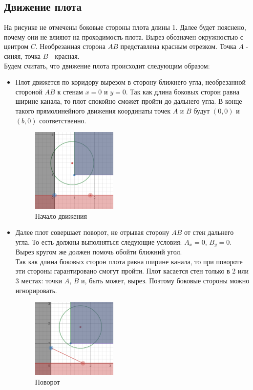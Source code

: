\subsection{Движение плота}
На рисунке не отмечены боковые стороны плота длины 1. Далее будет пояснено, почему они не влияют на проходимость плота. Вырез обозначен окружностью с центром $C$. Необрезанная сторона $AB$ представлена красным отрезком. Точка $A$ - синяя, точка $B$ - красная.\\

Будем считать, что движение плота происходит следующим образом:
\begin{itemize}
\item Плот движется по коридору вырезом в сторону ближнего угла, необрезанной стороной $AB$ к стенам $x=0$ и $y=0$. Так как длина боковых сторон равна ширине канала, то плот спокойно сможет пройти до дальнего угла. В конце такого прямолинейного движения координаты точек $A$ и $B$ будут $(0,0)$ и $(b,0)$ соответственно.
\begin{figure}[!htb]
    \centering
    \includegraphics[width=0.4\textwidth]{fig/sofa1.png}
    \caption{Начало движения}
\end{figure}

\newpage

\item Далее плот совершает поворот, не отрывая сторону $AB$ от стен дальнего угла. То есть должны выполняться следующие условия: $A_x=0$, $B_y=0$. Вырез кругом же должен помочь обойти ближний угол. \\
Так как длина боковых сторон плота равна ширине канала, то при повороте эти стороны гарантировано смогут пройти. Плот касается стен только в 2 или 3 местах: точки $A$, $B$ и, быть может, вырез. Поэтому боковые стороны можно игнорировать.
\begin{figure}[!htb]
    \centering
    \includegraphics[width=0.4\textwidth]{fig/sofa2.png}
    \caption{Поворот}
\end{figure}


\end{itemize}
